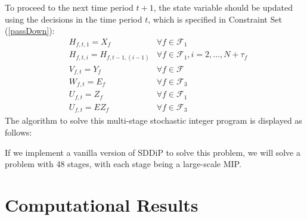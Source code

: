 \documentclass[12pt]{article}
\begin{document}
	To proceed to the next time period \(t+1\), the state variable should be updated using the decisions in the time period \(t\), which is specified in Constraint Set (\ref{passDown}):
	\begin{align*}
		& H_{f,t,1} = X_f & \forall f \in \mathcal{F}_1\\
		& H_{f,t,i} = H_{f,t-1,(i-1)} & \forall f \in \mathcal{F}_1, i = 2, \dots, N+\tau_f\\
		& V_{f,t} = Y_f & \forall f \in \mathcal{F}\\
		& W_{f,t} = E_f & \forall f \in \mathcal{F}_3\\
		& U_{f,t} = Z_f & \forall f \in \mathcal{F}_1\\
		& U_{f,t} = EZ_f & \forall f \in \mathcal{F}_3
	\end{align*}
	The algorithm to solve this multi-stage stochastic integer program is displayed as follows:\\
	\begin{algorithm}[H]
		
	\end{algorithm}
	\noindent If we implement a vanilla version of SDDiP to solve this problem, we will solve a problem with 48 stages, with each stage being a large-scale MIP. 
\section{Computational Results}

\nocite{*}


\end{document}
